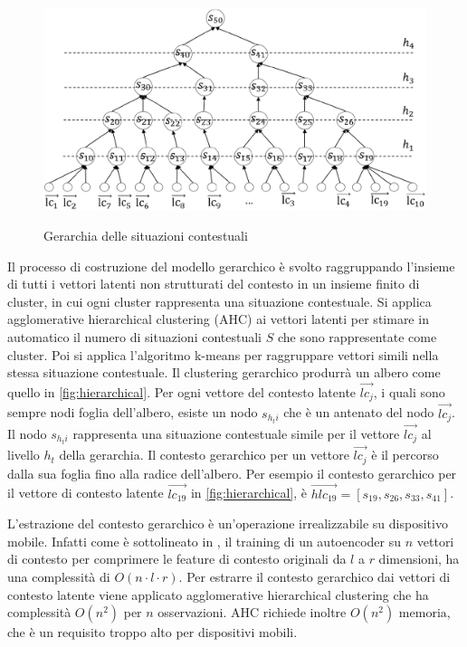 \begin{figure}
 \centering
  \includegraphics[scale=0.70]{immagini/hierarchical.png}
  \caption{Gerarchia delle situazioni contestuali}
  \label{fig:hierarchical}
  \cite{hierarchical-context}
\end{figure}

Il processo di costruzione del modello gerarchico è svolto raggruppando l'insieme di tutti i vettori latenti non strutturati del contesto in un insieme finito di cluster, in cui ogni cluster rappresenta una situazione contestuale. Si applica agglomerative hierarchical clustering (AHC) \cite{AHC} ai vettori latenti per stimare in automatico il numero di situazioni contestuali $S$ che sono rappresentate come cluster. Poi si applica l'algoritmo k-means  per raggruppare vettori simili nella stessa situazione contestuale. Il clustering gerarchico produrrà un albero come quello in \autoref{fig:hierarchical}. Per ogni vettore del contesto latente $\overrightarrow{lc_j}$, i quali sono sempre nodi foglia dell'albero, esiste un nodo $s_{h_ti}$ che è un antenato del nodo $\overrightarrow{lc_j}$. Il nodo $s_{h_ti}$ rappresenta una situazione contestuale simile per il vettore $\overrightarrow{lc_j}$ al livello $h_t$ della gerarchia. Il contesto gerarchico per un vettore $\overrightarrow{lc_j}$ è il percorso dalla sua foglia fino alla radice dell'albero. Per esempio il contesto gerarchico per il vettore di contesto latente $\overrightarrow{lc_{19}}$ in \autoref{fig:hierarchical}, è $\overrightarrow{hlc_{19}} = [s_{19}, s_{26}, s_{33}, s_{41}]$.

L'estrazione del contesto gerarchico è un'operazione irrealizzabile su dispositivo mobile. Infatti come è sottolineato in \cite{hierarchical-context}, il training di un autoencoder su $n$ vettori di contesto per comprimere le feature di contesto originali da $l$ a $r$ dimensioni, ha una complessità di $O(n \cdot l \cdot r)$. Per estrarre il contesto gerarchico dai vettori di contesto latente viene applicato agglomerative hierarchical clustering che ha complessità $O(n^2)$ per $n$ osservazioni. AHC richiede inoltre $O(n^2)$ memoria, che è un requisito troppo alto per dispositivi mobili. 

